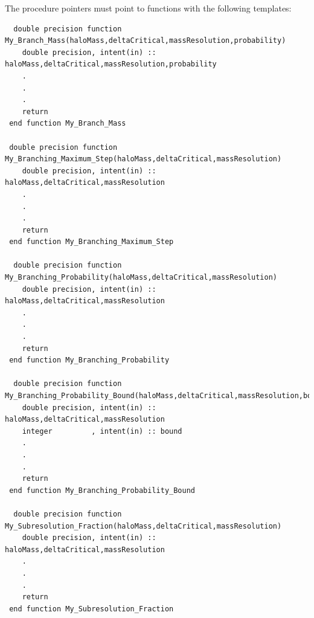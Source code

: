 The procedure pointers must point to functions with the following templates:
\begin{verbatim}
  double precision function My_Branch_Mass(haloMass,deltaCritical,massResolution,probability)
    double precision, intent(in) :: haloMass,deltaCritical,massResolution,probability
    .
    .
    .
    return
 end function My_Branch_Mass

 double precision function My_Branching_Maximum_Step(haloMass,deltaCritical,massResolution)
    double precision, intent(in) :: haloMass,deltaCritical,massResolution
    .
    .
    .
    return
 end function My_Branching_Maximum_Step

  double precision function My_Branching_Probability(haloMass,deltaCritical,massResolution)
    double precision, intent(in) :: haloMass,deltaCritical,massResolution
    .
    .
    .
    return
 end function My_Branching_Probability

  double precision function My_Branching_Probability_Bound(haloMass,deltaCritical,massResolution,bound)
    double precision, intent(in) :: haloMass,deltaCritical,massResolution
    integer         , intent(in) :: bound
    .
    .
    .
    return
 end function My_Branching_Probability_Bound

  double precision function My_Subresolution_Fraction(haloMass,deltaCritical,massResolution)
    double precision, intent(in) :: haloMass,deltaCritical,massResolution
    .
    .
    .
    return
 end function My_Subresolution_Fraction
\end{verbatim}
